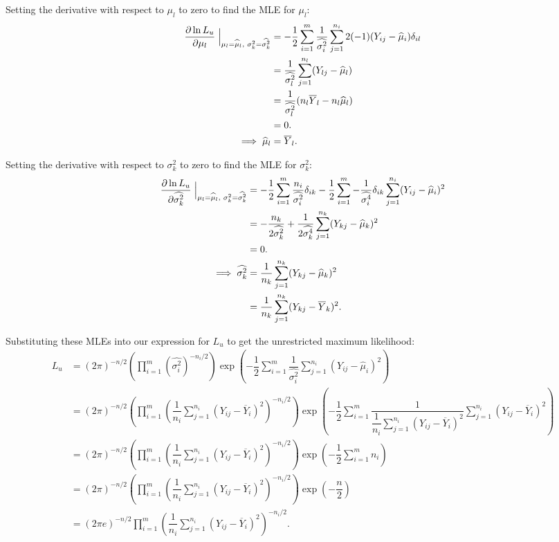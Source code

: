 \documentclass[12pt,a4paper]{article}
\newcommand{\ovY}{\overline{Y}}
\newcommand{\wmu}{\widehat{\mu}}
\newcommand{\wst}[1]{\widehat{\sigma^2_{#1}}}
\newcommand{\wstq}[1]{\widehat{\sigma^4_{#1}}}
\begin{document}
	Setting the derivative with respect to $\mu_l$ to zero to find the MLE for $\mu_l$:
	\begin{align*}
		\dfrac{\partial \ln{L_u}}{\partial \mu_l} \Bigm\lvert_{\mu_l=\wmu_l, \hspace{0.1cm}\sigma^2_k = \wst{k}} &= -\dfrac{1}{2}\sum_{i=1}^m \dfrac{1}{\wst{i}}\sum_{j=1}^{n_i} 2(-1)(Y_{ij}-\wmu_i)\delta_{il} \\
		&= \dfrac{1}{\wst{l}} \sum_{j=1}^{n_l} (Y_{lj}-\wmu_l) \\
		&= \dfrac{1}{\wst{l}} (n_l \ovY_l  -n_l \wmu_l) \\
		&= 0. \\
		\implies \wmu_l &= \ovY_l.
	\end{align*}

	Setting the derivative with respect to $\sigma^2_k$ to zero to find the MLE for $\sigma^2_k$:
	\begin{align*}
		\dfrac{\partial \ln{L_u}}{\partial \wst{k}}\Bigm\lvert_{\mu_l=\wmu_l, \hspace{0.1cm}\sigma^2_k = \wst{k}} &= -\dfrac{1}{2}\sum_{i=1}^m \dfrac{n_i}{\wst{i}} \delta_{ik} - \dfrac{1}{2}\sum_{i=1}^m -\dfrac{1}{\wstq{i}} \delta_{ik}\sum_{j=1}^{n_i} (Y_{ij}-\wmu_i)^2 \\
		&= -\dfrac{n_k}{2\wst{k}} + \dfrac{1}{2\wstq{k}}\sum_{j=1}^{n_k} (Y_{kj}-\wmu_k)^2 \\
		&= 0. \\
		\implies \wst{k} &= \dfrac{1}{n_k} \sum_{j=1}^{n_k} (Y_{kj}-\wmu_k)^2 \\
		&= \dfrac{1}{n_k} \sum_{j=1}^{n_k} (Y_{kj}-\ovY_k)^2.
	\end{align*}

	Substituting these MLEs into our expression for $L_u$ to get the unrestricted maximum likelihood:
	\begin{align*}
		L_u &= (2\pi)^{-n/2} \left(\prod_{i=1}^m (\wst{i})^{-n_i/2}\right)\exp{\left(-\dfrac{1}{2}\sum_{i=1}^m \dfrac{1}{\wst{i}}\sum_{j=1}^{n_i} (Y_{ij}-\wmu_i)^2\right)} \\
		&= (2\pi)^{-n/2}\left(\prod_{i=1}^m \left(\dfrac{1}{n_i} \sum_{j=1}^{n_i} (Y_{ij}-\ovY_i)^2\right)^{-n_i/2}\right)\exp{\left(-\dfrac{1}{2}\sum_{i=1}^m \dfrac{1}{\dfrac{1}{n_i}\sum_{j=1}^{n_i} (Y_{ij}-\ovY_i)^2}\sum_{j=1}^{n_i} (Y_{ij}-\ovY_i)^2\right)} \\
		&= (2\pi)^{-n/2}\left(\prod_{i=1}^m \left(\dfrac{1}{n_i} \sum_{j=1}^{n_i} (Y_{ij}-\ovY_i)^2\right)^{-n_i/2}\right)\exp{\left(-\dfrac{1}{2}\sum_{i=1}^m n_i\right)} \\
		&= (2\pi)^{-n/2}\left(\prod_{i=1}^m \left(\dfrac{1}{n_i} \sum_{j=1}^{n_i} (Y_{ij}-\ovY_i)^2\right)^{-n_i/2}\right) \exp\left(-\dfrac{n}{2}\right) \\
		&= (2\pi e)^{-n/2}\prod_{i=1}^m \left(\dfrac{1}{n_i} \sum_{j=1}^{n_i} (Y_{ij}-\ovY_i)^2\right)^{-n_i/2}.
	\end{align*}
\end{document}
